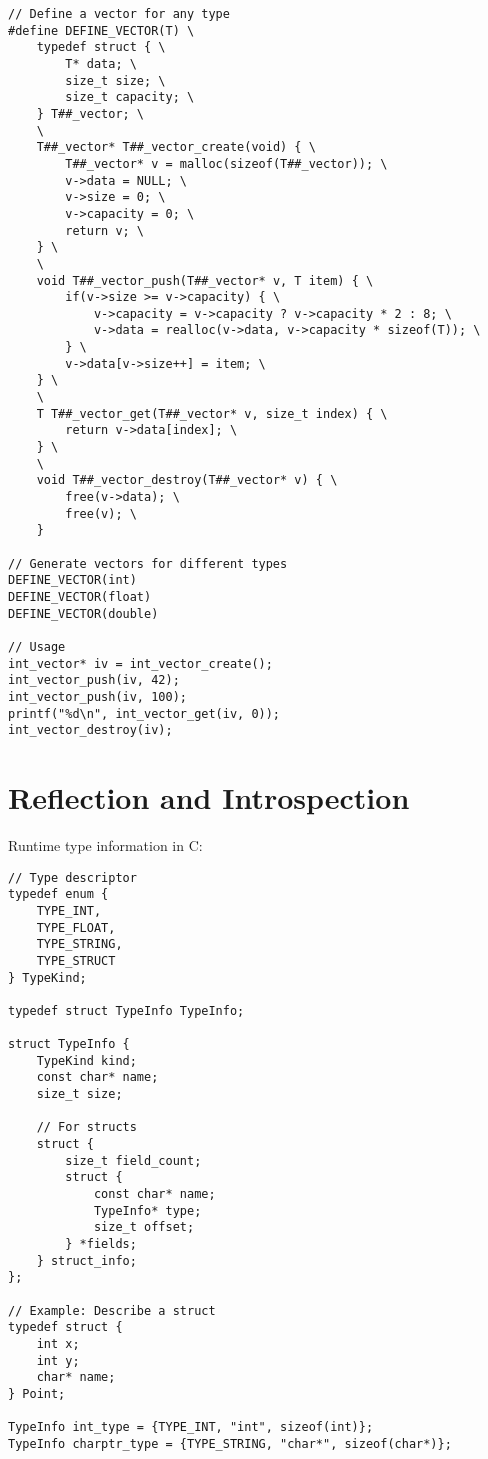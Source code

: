 \begin{description}[style=nextline,leftmargin=0pt]
\begin{lstlisting}
// Define a vector for any type
#define DEFINE_VECTOR(T) \
    typedef struct { \
        T* data; \
        size_t size; \
        size_t capacity; \
    } T##_vector; \
    \
    T##_vector* T##_vector_create(void) { \
        T##_vector* v = malloc(sizeof(T##_vector)); \
        v->data = NULL; \
        v->size = 0; \
        v->capacity = 0; \
        return v; \
    } \
    \
    void T##_vector_push(T##_vector* v, T item) { \
        if(v->size >= v->capacity) { \
            v->capacity = v->capacity ? v->capacity * 2 : 8; \
            v->data = realloc(v->data, v->capacity * sizeof(T)); \
        } \
        v->data[v->size++] = item; \
    } \
    \
    T T##_vector_get(T##_vector* v, size_t index) { \
        return v->data[index]; \
    } \
    \
    void T##_vector_destroy(T##_vector* v) { \
        free(v->data); \
        free(v); \
    }

// Generate vectors for different types
DEFINE_VECTOR(int)
DEFINE_VECTOR(float)
DEFINE_VECTOR(double)

// Usage
int_vector* iv = int_vector_create();
int_vector_push(iv, 42);
int_vector_push(iv, 100);
printf("%d\n", int_vector_get(iv, 0));
int_vector_destroy(iv);
\end{lstlisting}

\section{Reflection and Introspection}

Runtime type information in C:

\begin{lstlisting}
// Type descriptor
typedef enum {
    TYPE_INT,
    TYPE_FLOAT,
    TYPE_STRING,
    TYPE_STRUCT
} TypeKind;

typedef struct TypeInfo TypeInfo;

struct TypeInfo {
    TypeKind kind;
    const char* name;
    size_t size;

    // For structs
    struct {
        size_t field_count;
        struct {
            const char* name;
            TypeInfo* type;
            size_t offset;
        } *fields;
    } struct_info;
};

// Example: Describe a struct
typedef struct {
    int x;
    int y;
    char* name;
} Point;

TypeInfo int_type = {TYPE_INT, "int", sizeof(int)};
TypeInfo charptr_type = {TYPE_STRING, "char*", sizeof(char*)};


\end{lstlisting}
\end{description}
